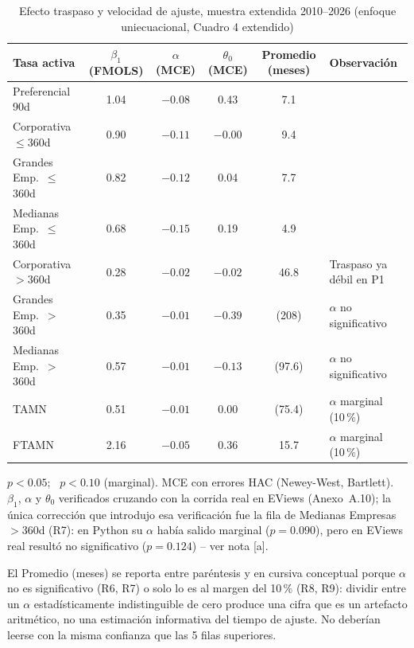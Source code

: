 \documentclass[12pt, letterpaper]{article}
\begin{document}
\begin{table}[ht]
\renewcommand{\thetable}{6}
\begin{threeparttable}
\caption{Efecto traspaso y velocidad de ajuste, muestra extendida
         2010--2026 (enfoque uniecuacional, Cuadro 4 extendido)}
\label{tab:cuadro4ext}
\small
\begin{tabular}{lccccl}
\toprule
Tasa activa & $\beta_1$ (FMOLS) & $\alpha$ (MCE) & $\theta_0$ (MCE) & Promedio (meses) & Observación\\
\midrule
Preferencial 90d         & 1.04 & $-0.08$\rlap{*} & 0.43\rlap{*} & 7.1  & \\
Corporativa $\le$360d    & 0.90 & $-0.11$\rlap{*} & $-0.00$      & 9.4  & \\
Grandes Emp.\ $\le$360d  & 0.82 & $-0.12$\rlap{*} & 0.04         & 7.7  & \\
Medianas Emp.\ $\le$360d & 0.68 & $-0.15$\rlap{*} & 0.19\rlap{*} & 4.9  & \\
Corporativa $>$360d      & 0.28 & $-0.02$\rlap{*} & $-0.02$      & 46.8 & Traspaso ya débil en P1 \\
Grandes Emp.\ $>$360d    & 0.35 & $-0.01$         & $-0.39$      & (208)\tnote{a} & $\alpha$ no significativo \\
Medianas Emp.\ $>$360d   & 0.57 & $-0.01$ & $-0.13$ & (97.6)\tnote{a} & $\alpha$ no significativo \\
TAMN                     & 0.51 & $-0.01$\rlap{\textdagger} & 0.00         & (75.4)\tnote{a} & $\alpha$ marginal (10\,\%) \\
FTAMN                    & 2.16 & $-0.05$\rlap{\textdagger} & 0.36         & 15.7 & $\alpha$ marginal (10\,\%) \\
\bottomrule
\end{tabular}
\begin{tablenotes}[flushleft]
\footnotesize
\item * $p<0.05$; \textdagger\ $p<0.10$ (marginal). MCE con errores
HAC (Newey-West, Bartlett). $\beta_1$, $\alpha$ y $\theta_0$
verificados cruzando con la corrida real en EViews (Anexo~A.10); la
única corrección que introdujo esa verificación fue la fila de
Medianas Empresas $>$360d (R7): en Python su $\alpha$ había salido
marginal ($p=0.090$), pero en EViews real resultó no significativo
($p=0.124$) -- ver nota [a].
\item[a] El Promedio (meses) se reporta entre paréntesis y en cursiva
conceptual porque $\alpha$ no es significativo (R6, R7) o solo lo es
al margen del 10\,\% (R8, R9): dividir entre un $\alpha$
estadísticamente indistinguible de cero produce una cifra que es un
artefacto aritmético, no una estimación informativa del tiempo de
ajuste. No deberían leerse con la misma confianza que las 5 filas
superiores.
\end{tablenotes}
\end{threeparttable}
\end{table}
\end{document}
